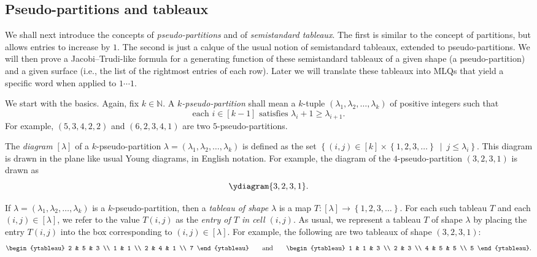 \documentclass[reqno]{amsart}
\newcommand{\0}{\phantom{c}}
\newcommand{\ive}[1]{\left[ #1 \right]}
\newcommand{\defn}[1]{{\color{darkred}\emph{#1}}} %
\theoremstyle{plain}
\theoremstyle{definition}
\numberwithin{equation}{section}
\begin{document}
\subsection{Pseudo-partitions and tableaux}

We shall next introduce the concepts of \textit{pseudo-partitions} and of
\textit{semistandard tableaux}. The first is similar to the concept of
partitions, but allows entries to increase by $1$. The second is just a calque
of the usual notion of semistandard tableaux, extended to pseudo-partitions.
We will then prove a Jacobi--Trudi-like formula for a generating function of
these semistandard tableaux of a given shape (a pseudo-partition) and a given
surface (i.e., the list of the rightmost entries of each row). Later we will
translate these tableaux into MLQs that yield a specific word when applied to
$1\cdots1$.

We start with the basics. Again, fix $k\in\mathbb{N}$. A
\defn{$k$-pseudo-partition} shall mean a $k$-tuple $\left(  \lambda
_{1},\lambda_{2},\ldots,\lambda_{k}\right)  $ of positive integers such that%
\[
\text{each }i\in\left[  k-1\right]  \text{ satisfies }\lambda_{i}+1\geq
\lambda_{i+1}.
\]
For example, $\left(  5,3,4,2,2\right)  $ and $\left(  6,2,3,4,1\right)  $ are
two $5$-pseudo-partitions.

The \defn{diagram $\ive{\lambda}$} of a $k$-pseudo-partition $\lambda=\left(
\lambda_{1},\lambda_{2},\ldots,\lambda_{k}\right)  $ is defined as the set
$\left\{  \left(  i,j\right)  \in\left[  k\right]  \times\left\{
1,2,3,\ldots\right\}  \ \mid\ j\leq\lambda_{i}\right\}  $. This diagram is
drawn in the plane like usual Young diagrams, in English notation. For
example, the diagram of the $4$-pseudo-partition $\left(  3,2,3,1\right)  $ is
drawn as%
\[
\ydiagram{3,2,3,1}.
\]


If $\lambda=\left(  \lambda_{1},\lambda_{2},\ldots,\lambda_{k}\right)  $ is a
$k$-pseudo-partition, then a \defn{tableau of shape $\lambda$} is a map
$T:\left[  \lambda\right]  \rightarrow\left\{  1,2,3,\ldots\right\}  $. For
each such tableau $T$ and each $\left(  i,j\right)  \in\left[  \lambda\right]
$, we refer to the value $T\left(  i,j\right)  $ as the
\defn{entry of $T$ in cell $\left(i,j\right)$}. As usual, we represent a
tableau $T$ of shape $\lambda$ by placing the entry $T\left(  i,j\right)  $
into the box corresponding to $\left(  i,j\right)  \in\left[  \lambda\right]
$. For example, the following are two tableaux of shape $\left(
3,2,3,1\right)  $:%
\begin{equation}
\begin{ytableau} 2 & 5 & 3 \\ 1 & 1 \\ 2 & 4 & 1 \\ 7 \end{ytableau}\qquad
\text{and}\qquad
\begin{ytableau} 1 & 1 & 3 \\ 2 & 3 \\ 4 & 5 & 5 \\ 5 \end{ytableau}.
\label{eq.tableau.exas}%
\end{equation}
\end{document}
